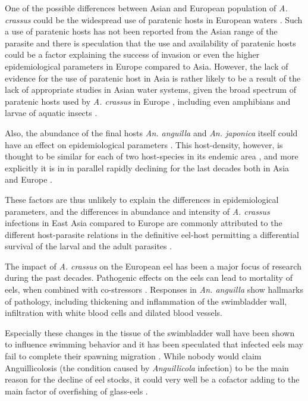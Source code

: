 One of the possible differences between Asian and European population
of \textit{A. crassus} could be the widespread use of paratenic hosts
in European waters \cite{thomas_paratenic_1992,
  pietrock_dynamics_2002}. Such a use of paratenic hosts has not been
reported from the Asian range of the parasite and there is speculation
that the use and availability of paratenic hosts could be a factor
explaining the success of invasion or even the higher epidemiological
parameters in Europe compared to Asia. However, the lack of evidence
for the use of paratenic host in Asia is rather likely to be a result
of the lack of appropriate studies in Asian water systems, given the
broad spectrum of paratenic hosts used by \textit{A. crassus} in
Europe
\cite{pietrock_dynamics_2002,rolbiecki_acndab_2004,szkely_dynamics_1995},
including even amphibians and larvae of aquatic insects
\cite{moravec_amphibians_1998}.

Also, the abundance of the final hosts \textit{An. anguilla} and
\textit{An. japonica} itself could have an effect on epidemiological
parameters \cite{schabuss_dynamics_2005}. This host-density, however,
is thought to be similar for each of two host-species in its endemic
area \cite{tesch1983aal}, and more explicitly it is in in parallel
rapidly declining for the last decades both in Asia and Europe
\cite{pmid12713741}.

These factors are thus unlikely to explain the differences in
epidemiological parameters, and the differences in abundance and
intensity of \textit{A. crassus} infections in East Asia compared to
Europe are commonly attributed to the different host-parasite
relations in the definitive eel-host permitting a differential
survival of the larval and the adult parasites
\cite{knopf_differences_2004, knopf_swimbladder_2006}.

The impact of \textit{A. crassus} on the European eel has been a major
focus of research during the past decades. Pathogenic effects on the
eels can lead to mortality of eels, when combined with co-stressors
\cite{gollock_physiological_2005}. Responses in \textit{An. anguilla}
show hallmarks of pathology, including thickening
\cite{wurtz_tara_2000} and inflammation
\cite{beregi_radiodiagnostic_1998} of the swimbladder wall,
infiltration with white blood cells and dilated blood vessels.

Especially these changes in the tissue of the swimbladder wall have
been shown to influence swimming behavior and it has been speculated
that infected eels may fail to complete their spawning migration
\cite{palstra_swimming_2007}. While nobody would claim Anguillicolosis
(the condition caused by \textit{Anguillicola} infection) to be the
main reason for the decline of eel stocks, it could very well be a
cofactor \cite{sures_science_letter} adding to the main factor of
overfishing of glass-eels \cite{pmid12713741}.

